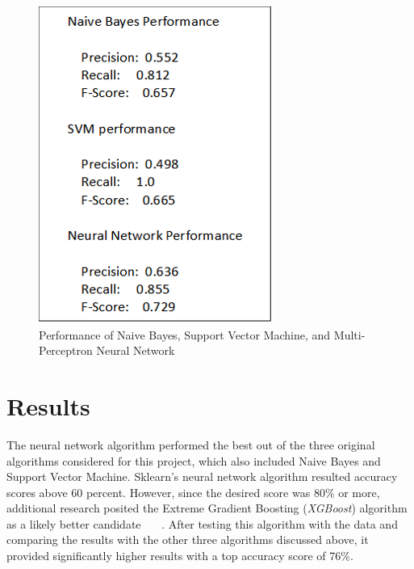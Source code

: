 \begin{figure}[H]
\centering
\includegraphics[width=\columnwidth]{images/ML_algorithms_performance.png}
\caption{Performance of Naive Bayes, Support Vector Machine, and Multi-Perceptron 
Neural Network}
\label{fig:performance_scores}
\end{figure} 

\section{Results}

The neural network algorithm performed the best out of the three
original algorithms considered for this project, which also included
Naive Bayes and Support Vector Machine.  Sklearn's neural network
algorithm resulted accuracy scores above 60 percent.  However, since
the desired score was 80\% or more, additional research posited the
Extreme Gradient Boosting (\emph{XGBoost}) algorithm as a likely
better candidate~\cite{Chen2016} ~\cite{baba2016}~\cite{phunter2016}.
After testing this algorithm with the data and comparing the results
with the other three algorithms discussed above, it provided
significantly higher results with a top accuracy score of 76\%.

